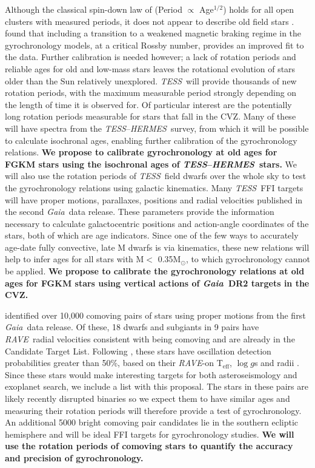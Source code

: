 \documentclass[letterpaper,12pt,preprint]{hack_aastex}
\newcommand{\TESS}{{\it TESS}}
\newcommand{\tess}{{\it TESS}}
\newcommand{\Gaia}{{\it Gaia}}
\newcommand{\RAVE}{{\it RAVE}}
\newcommand{\hermes}{{\it HERMES}}
\newcommand{\HERMES}{{\it HERMES}}
\begin{document}
Although the classical spin-down law of \citet{skumanich1972} (Period
$\propto$ Age$^{1/2}$) holds for all open clusters with measured periods, it does
not appear to describe old field stars \citep{angus2015, van-saders2016}.
\citet{van-saders2016} found that including a transition to a weakened magnetic
braking regime in the gyrochronology models, at a critical Rossby number,
provides an improved fit to the data.
Further calibration is needed however; a lack of rotation periods and reliable
ages for old and low-mass stars leaves the rotational evolution of stars older
than the Sun relatively unexplored.
\TESS\ will provide thousands of new rotation periods, with the maximum
measurable period strongly depending on the length of time it is observed for.
Of particular interest are the potentially long rotation periods measurable
for stars that fall in the CVZ.
Many of these will have spectra from the \TESS --\HERMES\ survey, from which
it will be possible to calculate isochronal ages, enabling further calibration
of the gyrochronology relations.
{\bf We propose to calibrate gyrochronology at old ages for FGKM stars using
the isochronal ages of \TESS--\hermes\ stars.}
We will also use the rotation periods of \TESS\ field dwarfs over the whole sky
to test the gyrochronology relations using galactic kinematics.
Many \tess\ FFI targets will have proper motions, parallaxes, positions and
radial velocities published in the second \Gaia\ data release.
These parameters provide the information necessary to calculate galactocentric
positions and action-angle coordinates of the stars, both of which are age
indicators.
Since one of the few ways to accurately age-date fully convective, late M
dwarfs is via kinematics, these new relations will help to infer ages for all
stars with M$<$ 0.35M$_\odot$, to which gyrochronology cannot be applied.
{\bf We propose to calibrate the gyrochronology relations at old ages for FGKM
stars using vertical actions of \Gaia\ DR2 targets in the CVZ.}

\citet{oh2016} identified over 10,000 comoving pairs of stars using proper
motions from the first \Gaia\ data release.
Of these, 18 dwarfs and subgiants in 9 pairs have \RAVE\ radial velocities
consistent with being comoving and are already in the Candidate Target List.
Following \citet{campante2017}, these stars have oscillation detection
probabilities greater than 50\%, based on their \RAVE-on T$_{\mathrm{eff}}$,
$\log g$s and radii \citep{casey2017}.
Since these stars would make interesting targets for both asteroseismology and
exoplanet search, we include a list with this proposal.
The stars in these pairs are likely recently disrupted binaries so we
expect them to have similar ages and measuring their rotation periods will
therefore provide a test of gyrochronology.
An additional 5000 bright comoving pair candidates lie in the southern
ecliptic hemisphere and will be ideal FFI targets for gyrochronology studies.
{\bf We will use the rotation periods of comoving stars to quantify the
accuracy and precision of gyrochronology.}
\end{document}
